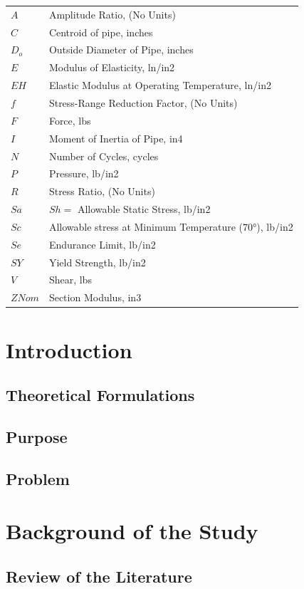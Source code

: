 \documentclass[12pt]{report}
\begin{document}
\begin{tabular}{ll}
$A$ & Amplitude Ratio, (No Units) \\
$C$ & Centroid of pipe, inches \\
$D_o$ & Outside Diameter of Pipe, inches \\
$E$ & Modulus of Elasticity, ln/in2 \\
$EH$ & Elastic Modulus at Operating Temperature, ln/in2 \\
$f$ & Stress-Range Reduction Factor, (No Units) \\
$F$ & Force, lbs \\
$I$ & Moment of Inertia of Pipe, in4 \\
$N$ & Number of Cycles, cycles \\
$P$ & Pressure, lb/in2 \\
$R$ & Stress Ratio, (No Units) \\
$Sa$ & $Sh =$ Allowable Static Stress, lb/in2 \\
$Sc$ & Allowable stress at Minimum Temperature (70°), lb/in2 \\
$Se$ & Endurance Limit, lb/in2 \\
$SY$ & Yield Strength, lb/in2 \\
$V$ & Shear, lbs \\
$ZNom$ & Section Modulus, in3
\end{tabular}

\tableofcontents

\chapter{Introduction}
\lipsum[1-3]
\section{Theoretical Formulations}
\lipsum[4-14]
\section{Purpose}
\lipsum[15-18]
\section{Problem}
\lipsum[19-30]

\chapter{Background of the Study}
\lipsum[1-25]
\section{Review of the Literature}
\lipsum[26-30]
\end{document}
